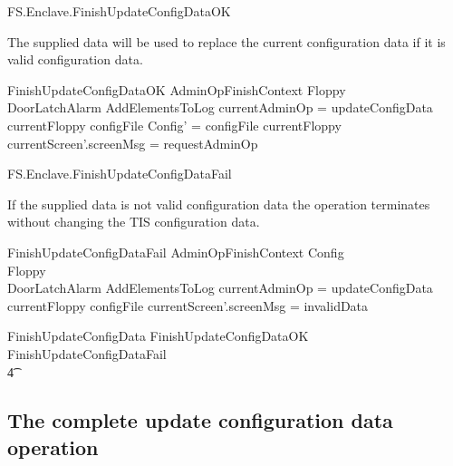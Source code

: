 \begin{traceunit}{FS.Enclave.FinishUpdateConfigDataOK}
\end{traceunit}


The supplied data will be used to replace the current configuration data
if it is valid configuration data.

\begin{schema}{FinishUpdateConfigDataOK}
        AdminOpFinishContext
\also
        \Xi Floppy
\\      \Xi DoorLatchAlarm
\also
        AddElementsToLog
\where
        \The currentAdminOp = updateConfigData
\also        
        currentFloppy \in \ran configFile
\also
        \theta Config' = configFile \inv currentFloppy
\also
        currentScreen'.screenMsg = requestAdminOp
\end{schema}

\begin{traceunit}{FS.Enclave.FinishUpdateConfigDataFail}
\end{traceunit}


If the supplied data is not valid configuration data the operation
terminates without changing the TIS configuration data.

\begin{schema}{FinishUpdateConfigDataFail}
        AdminOpFinishContext
\also
        \Xi Config
\\      \Xi Floppy
\\      \Xi DoorLatchAlarm
\also
        AddElementsToLog
\where
        \The currentAdminOp = updateConfigData
\also        
        currentFloppy \notin \ran configFile
\also
        currentScreen'.screenMsg = invalidData
\end{schema}

\begin{zed}
        FinishUpdateConfigData  FinishUpdateConfigDataOK \lor
        FinishUpdateConfigDataFail
\\ \t4  \lor
        [~ BadAdminLogout | enclaveStatus = waitingFinishAdminOp 
\\ \t6  \land \The currentAdminOp = updateConfigData      ~]
\end{zed}

\subsection{The complete update configuration data operation}

